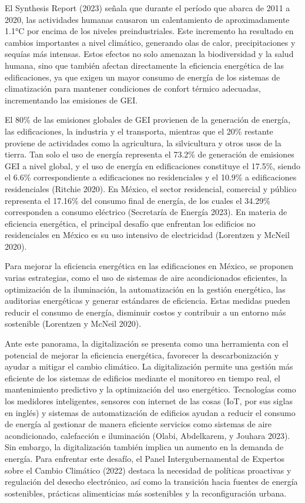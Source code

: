 \documentclass[
  12pt,
  letterpaper,
  DIV=11,
  numbers=noendperiod]{scrreport}
\begin{document}
El Synthesis Report (2023) señala que durante el período que abarca de
2011 a 2020, las actividades humanas causaron un calentamiento de
aproximadamente 1.1°C por encima de los niveles preindustriales. Este
incremento ha resultado en cambios importantes a nivel climático,
generando olas de calor, precipitaciones y sequías más intensas. Estos
efectos no solo amenazan la biodiversidad y la salud humana, sino que
también afectan directamente la eficiencia energética de las
edificaciones, ya que exigen un mayor consumo de energía de los sistemas
de climatización para mantener condiciones de confort térmico adecuadas,
incrementando las emisiones de GEI.

El 80\% de las emisiones globales de GEI provienen de la generación de
energía, las edificaciones, la industria y el transporta, mientras que
el 20\% restante proviene de actividades como la agricultura, la
silvicultura y otros usos de la tierra. Tan solo el uso de energía
representa el 73.2\% de generación de emisiones GEI a nivel global, y el
uso de energía en edificaciones constituye el 17.5\%, siendo el 6.6\%
correspondiente a edificaciones no residenciales y el 10.9\% a
edificaciones residenciales (Ritchie 2020). En México, el sector
residencial, comercial y público representa el 17.16\% del consumo final
de energía, de los cuales el 34.29\% corresponden a consumo eléctrico
(Secretaría de Energía 2023). En materia de eficiencia energética, el
principal desafío que enfrentan los edificios no residenciales en México
es su uso intensivo de electricidad (Lorentzen y McNeil 2020).

Para mejorar la eficiencia energética en las edificaciones en México, se
proponen varias estrategias, como el uso de sistemas de aire
acondicionados eficientes, la optimización de la iluminación, la
automatización en la gestión energética, las auditorias energéticas y
generar estándares de eficiencia. Estas medidas pueden reducir el
consumo de energía, disminuir costos y contribuir a un entorno más
sostenible (Lorentzen y McNeil 2020).

Ante este panorama, la digitalización se presenta como una herramienta
con el potencial de mejorar la eficiencia energética, favorecer la
descarbonización y ayudar a mitigar el cambio climático. La
digitalización permite una gestión más eficiente de los sistemas de
edificios mediante el monitoreo en tiempo real, el mantenimiento
predictivo y la optimización del uso energético. Tecnologías como los
medidores inteligentes, sensores con internet de las cosas (IoT, por sus
siglas en inglés) y sistemas de automatización de edificios ayudan a
reducir el consumo de energía al gestionar de manera eficiente servicios
como sistemas de aire acondicionado, calefacción e iluminación (Olabi,
Abdelkarem, y Jouhara 2023). Sin embargo, la digitalización también
implica un aumento en la demanda de energía. Para enfrentar este
desafío, el Panel Intergubernamental de Expertos sobre el Cambio
Climático (2022) destaca la necesidad de políticas proactivas y
regulación del desecho electrónico, así como la transición hacia fuentes
de energía sostenibles, prácticas alimenticias más sostenibles y la
reconfiguración urbana.
\end{document}
